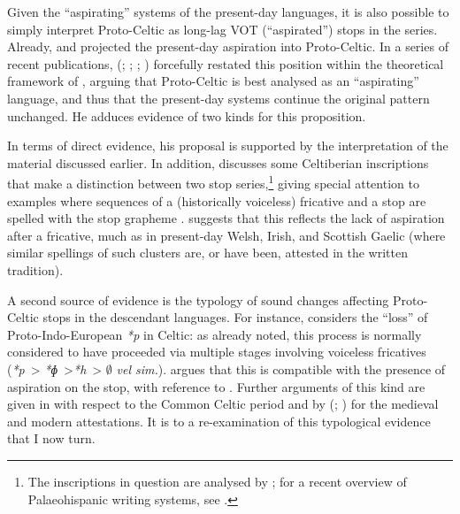 \documentclass[output=paper,colorlinks,citecolor=brown]{langscibook}
\begin{document}
Given the \enquote{aspirating} systems of the present\hyp day languages, it is also possible to simply interpret Proto\hyp Celtic as long\hyp lag VOT (\enquote{aspirated}) stops in the  series. Already, \citet{pedersen1909vergleichende} and \citet{cccg} projected the present\hyp day aspiration into Proto\hyp Celtic. In a series of recent publications, \citeauthor{eska2017} (\citeyear{eska2017}; \citeyear{Eska2018}; \citeyear{eska2019laryngeal}; \citeyear{eska2020interarticulatory}) forcefully restated this position within the theoretical framework of , arguing that Proto\hyp Celtic is best analysed as an \enquote{aspirating} language, and thus that the present\hyp day systems continue the original pattern unchanged. He adduces evidence of two kinds for this proposition.

In terms of direct evidence, his proposal is supported by the interpretation of the  material discussed earlier. In addition, \textcite{eska2017} discusses some Celtiberian inscriptions that make a distinction between two stop series,\footnote{The inscriptions in question are analysed by \textcite{jordán2007estudios}; for a recent overview of Palaeohispanic writing systems, see \textcite{ferrer2019palaeohispanic}.} giving special attention to examples where sequences of a (historically voiceless) fricative and a stop are spelled with the  stop grapheme . \Textcite{eska2017} suggests that this reflects the lack of aspiration after a fricative, much as in present\hyp day Welsh, Irish, and Scottish Gaelic (where similar spellings of such clusters are, or have been, attested in the written tradition).

A second source of evidence is the typology of sound changes affecting Proto\hyp Celtic stops in the descendant languages. For instance, \textcite{Eska2018} considers the \enquote{loss} of Proto\hyp Indo\hyp European \textit{*p} in Celtic: as already noted, this process is normally considered to have proceeded via multiple stages involving voiceless fricatives (\textit{*p}~> \textit{*ɸ}~>\textit{*h}~> $\emptyset$ \emph{vel sim.}). \Textcite{Eska2018} argues that this is compatible with the presence of aspiration on the stop, with reference to \textcite[57]{kümmel2007konsonantenwandel}. Further arguments of this kind are given in \textcite{Eska2018} with respect to the Common Celtic period and by \citeauthor{eska2019laryngeal} (\citeyear{eska2019laryngeal}; \citeyear{eska2020interarticulatory}) for the medieval and modern attestations. It is to a re\hyp examination of this typological evidence that I now turn.
\end{document}
